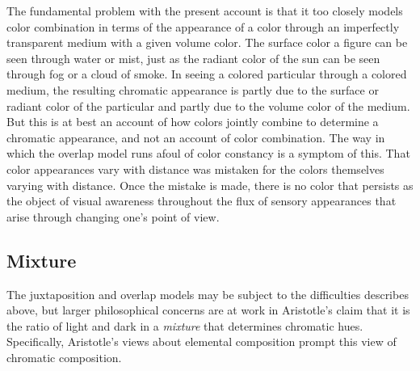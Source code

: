 The fundamental problem with the present account is that it too closely models color combination in terms of the appearance of a color through an imperfectly transparent medium with a given volume color. The surface color a figure can be seen through water or mist, just as the radiant color of the sun can be seen through fog or a cloud of smoke. In seeing a colored particular through a colored medium, the resulting chromatic appearance is partly due to the surface or radiant color of the particular and partly due to the volume color of the medium. But this is at best an account of how colors jointly combine to determine a chromatic appearance, and not an account of color combination. The way in which the overlap model runs afoul of color constancy is a symptom of this. That color appearances vary with distance was mistaken for the colors themselves varying with distance. Once the mistake is made, there is no color that persists as the object of visual awareness throughout the flux of sensory appearances that arise through changing one's point of view.


\subsection{Mixture} %
\label{sub:mixture}

The juxtaposition and overlap models may be subject to the difficulties describes above, but larger philosophical concerns are at work in Aristotle's claim that it is the ratio of light and dark in a \emph{mixture} that determines chromatic hues. Specifically, Aristotle's views about elemental composition prompt this view of chromatic composition.


